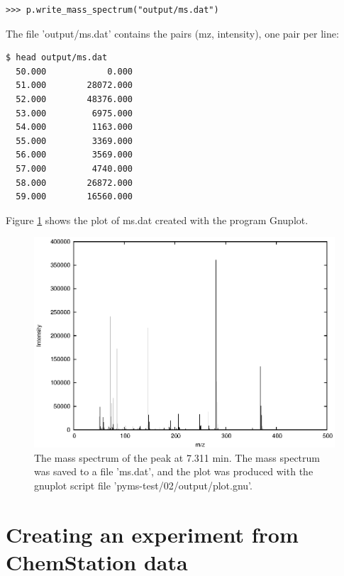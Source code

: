 \begin{verbatim}
>>> p.write_mass_spectrum("output/ms.dat")
\end{verbatim}

\noindent
The file 'output/ms.dat' contains the pairs (mz, intensity), one pair
per line:

\begin{verbatim}
$ head output/ms.dat
  50.000            0.000
  51.000        28072.000
  52.000        48376.000
  53.000         6975.000
  54.000         1163.000
  55.000         3369.000
  56.000         3569.000
  57.000         4740.000
  58.000        26872.000
  59.000        16560.000
\end{verbatim}

Figure \ref{fig:mass-spectrum} shows the plot of ms.dat created with the
program Gnuplot.

\begin{figure}[htp]
\begin{center}
\includegraphics{graphics/pyms-test/ms.eps}
\caption{The mass spectrum of the peak at 7.311 min. The mass spectrum was
saved to a file 'ms.dat', and the plot was produced with the gnuplot script
file 'pyms-test/02/output/plot.gnu'.}
\label{fig:mass-spectrum}
\end{center}
\end{figure}

\section{Creating an experiment from ChemStation data}



